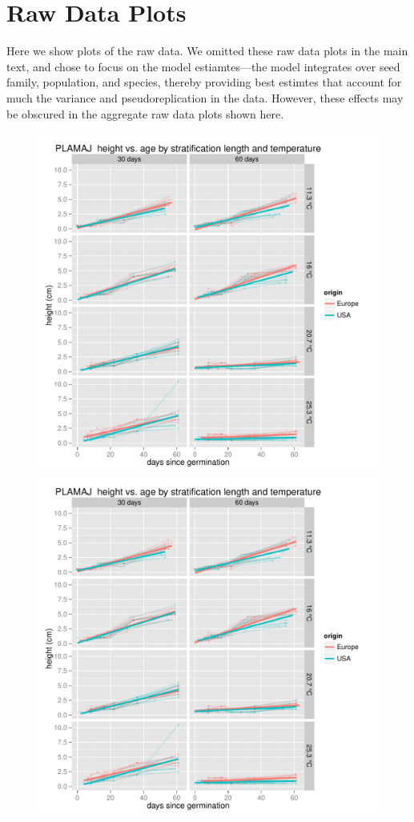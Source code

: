 \documentclass[12pt]{article}\usepackage[]{graphicx}\usepackage[]{color}
\begin{document}
\section{Raw Data Plots}
Here we show plots of the raw data. We omitted these raw data plots in the main text, and chose to focus on the model estiamtes---the model integrates over seed family, population, and species, thereby providing best estimtes that account for much the variance and pseudoreplication in the data. However, these effects may be obscured in the aggregate raw data plots shown here.
\begin{figure}[H]
  \centering
  {\includegraphics[scale=.5, page=7, trim=0cm 0cm 3cm 1.2cm, clip=TRUE]{supplement.pdf}}
  {\includegraphics[scale=.5, page=3, trim=0cm 0cm 3cm 1.2cm, clip=TRUE]{supplement.pdf}}

\end{figure}
\end{document}
